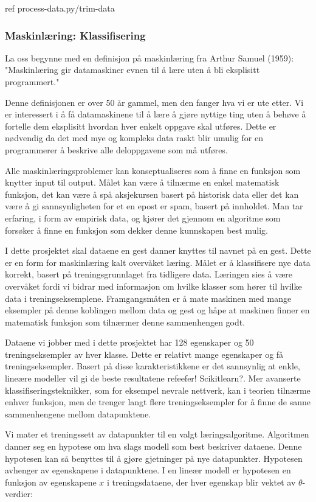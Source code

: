 {\color{red} ref process-data.py/trim-data}

\subsubsection{Maskinlæring: Klassifisering}
La oss begynne med en definisjon på maskinlæring fra Arthur Samuel (1959): "Maskinlæring gir datamaskiner evnen til å lære uten å bli eksplisitt programmert."

Denne definisjonen er over 50 år gammel, men den fanger hva vi er ute etter. Vi er interessert i å få datamaskinene til å lære å gjøre nyttige ting uten å behøve å fortelle dem eksplisitt hvordan hver enkelt oppgave skal utføres. Dette er nødvendig da det med mye og kompleks data raskt blir umulig for en programmerer å beskrive alle deloppgavene som må utføres.

Alle maskinlæringsproblemer kan konseptualiseres som å finne en funksjon som knytter input til output. Målet kan være å tilnærme en enkel matematisk funksjon, det kan være å spå aksjekursen basert på historisk data eller det kan være å gi sannsynligheten for et en epost er spam, basert på innholdet. Man tar erfaring, i form av empirisk data, og kjører det gjennom en algoritme som forsøker å finne en funksjon som dekker denne kunnskapen best mulig.

I dette prosjektet skal dataene en gest danner knyttes til navnet på en gest. Dette er en form for maskinlæring kalt overvåket læring. Målet er å klassifisere nye data korrekt, basert på treningsgrunnlaget fra tidligere data. Læringen sies å være overvåket fordi vi bidrar med informasjon om hvilke klasser som hører til hvilke data i treningseksemplene. Framgangsmåten er å mate maskinen med mange eksempler på denne koblingen mellom data og gest og håpe at maskinen finner en matematisk funksjon som tilnærmer denne sammenhengen godt.

Dataene vi jobber med i dette prosjektet har 128 egenskaper og 50 treningseksempler av hver klasse. Dette er relativt mange egenskaper og få treningseksempler. Basert på disse karakteristikkene er det sannsynlig at enkle, lineære modeller vil gi de beste resultatene {\color{red} refeefer! Scikitlearn?}. Mer avanserte klassifiseringsteknikker, som for eksempel nevrale nettverk, kan i teorien tilnærme enhver funksjon, men de trenger langt flere treningseksempler for å finne de sanne sammenhengene mellom datapunktene.

Vi mater et treningssett av datapunkter til en valgt læringsalgoritme. Algoritmen danner seg en hypotese om hva slags modell som best beskriver dataene. Denne hypotesen kan så benyttes til å gjøre gjetninger på nye datapunkter. Hypotesen avhenger av egenskapene i datapunktene. I en lineær modell er hypotesen en funksjon av egenskapene $x$ i treningsdataene, der hver egenskap blir vektet av $\theta$-verdier:

